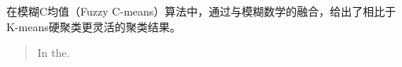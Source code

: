 \begin{cnabstract}
  在模糊C均值（Fuzzy C-means）算法中，通过与模糊数学的融合，给出了相比于K-means硬聚类更灵活的聚类结果。
\end{cnabstract}
\renewcommand{\abstractname}{Abstract}
\begin{abstract}
  In the.
  \par
\end{abstract} 